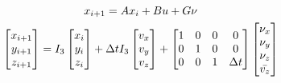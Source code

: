 \begin{gather}
\label{eq:model_1}
    x_{i+1} = Ax_i + Bu + G\nu \\
    \begin{bmatrix}
    x_{i+1}\\
    y_{i+1}\\
    z_{i+1}
    \end{bmatrix}=
    I_3
    \begin{bmatrix}
    x_{i}\\
    y_{i}\\
    z_{i}
    \end{bmatrix} +
    \Delta t
    I_3
    \begin{bmatrix}
    v_x\\
    v_y\\
    v_z
    \end{bmatrix} + %
    \begin{bmatrix}
    1&0&0&0\\
    0&1&0&0\\
    0&0&1&\Delta t
    \end{bmatrix}
    \begin{bmatrix}
    \nu_x\\
    \nu_y\\
    \nu_z\\
    \bar{v_z}
    \end{bmatrix}
     \notag
\end{gather}